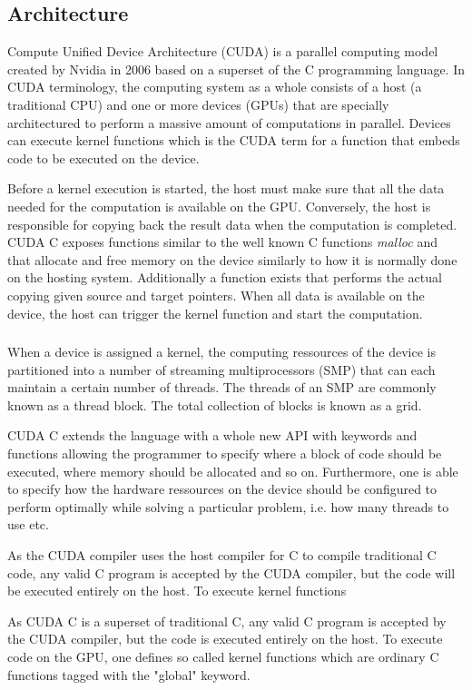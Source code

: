 
\subsection{Architecture}
Compute Unified Device Architecture (CUDA) is a parallel computing model created by Nvidia in 2006 based on a superset of the C programming language. In CUDA terminology, the computing system as a whole consists of a host (a traditional CPU) and one or more devices (GPUs) that are specially architectured to perform a massive amount of computations in parallel. Devices can execute kernel functions which is the CUDA term for a function that embeds code to be executed on the device.

Before a kernel execution is started, the host must make sure that all the data needed for the computation is available on the GPU. Conversely, the host is responsible for copying back the result data when the computation is completed. CUDA C exposes functions similar to the well known C functions \emph{malloc} and  that allocate and free memory on the device similarly to how it is normally done on the hosting system. Additionally a function exists that performs the actual copying given source and target pointers. When all data is available on the device, the host can trigger the kernel function and start the computation.

\subsubsection{}

When a device is assigned a kernel, the computing ressources of the device is partitioned into a number of streaming multiprocessors (SMP) that can each maintain a certain number of threads. The threads of an SMP are   commonly known as a thread block. The total collection of blocks is known as a grid. 

 CUDA C extends the language with a whole new API with keywords and functions allowing the programmer to specify where a block of code should be executed, where memory should be allocated and so on. Furthermore, one is able to specify how the hardware ressources on the device should be configured to perform optimally while solving a particular problem, i.e. how many threads to use etc.



As the CUDA compiler uses the host compiler for C to compile traditional C code, any valid C program is accepted by the CUDA compiler, but the code will be executed entirely on the host. To execute kernel functions 


As CUDA C is a superset of traditional C, any valid C program is accepted by the CUDA compiler, but the code is executed entirely on the host. To execute code on the GPU, one defines so called kernel functions which are ordinary C functions tagged with the "global" keyword.